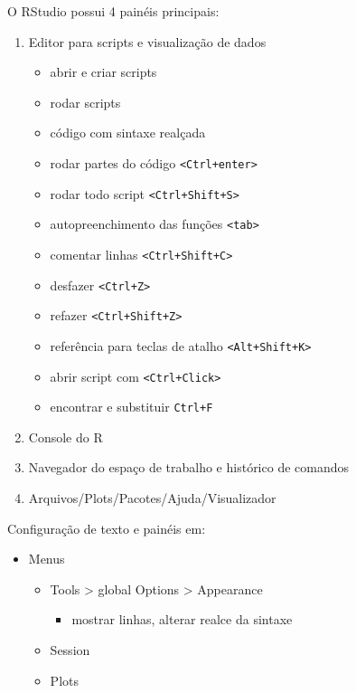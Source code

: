 \documentclass[]{book}
\providecommand{\tightlist}{%
  \setlength{\itemsep}{0pt}\setlength{\parskip}{0pt}}
\begin{document}
O RStudio possui 4 painéis principais:

\begin{enumerate}
\def\labelenumi{\arabic{enumi}.}
\item
  Editor para scripts e visualização de dados

  \begin{itemize}
  \tightlist
  \item
    abrir e criar scripts
  \item
    rodar scripts
  \item
    código com sintaxe realçada
  \item
    rodar partes do código \texttt{\textless{}Ctrl+enter\textgreater{}}
  \item
    rodar todo script \texttt{\textless{}Ctrl+Shift+S\textgreater{}}
  \item
    autopreenchimento das funções \texttt{\textless{}tab\textgreater{}}
  \item
    comentar linhas \texttt{\textless{}Ctrl+Shift+C\textgreater{}}
  \item
    desfazer \texttt{\textless{}Ctrl+Z\textgreater{}}
  \item
    refazer \texttt{\textless{}Ctrl+Shift+Z\textgreater{}}
  \item
    referência para teclas de atalho
    \texttt{\textless{}Alt+Shift+K\textgreater{}}
  \item
    abrir script com \texttt{\textless{}Ctrl+Click\textgreater{}}
  \item
    encontrar e substituir \texttt{Ctrl+F}
  \end{itemize}
\item
  Console do R
\item
  Navegador do espaço de trabalho e histórico de comandos
\item
  Arquivos/Plots/Pacotes/Ajuda/Visualizador
\end{enumerate}

Configuração de texto e painéis em:

\begin{itemize}
\tightlist
\item
  Menus

  \begin{itemize}
  \tightlist
  \item
    Tools \textgreater{} global Options \textgreater{} Appearance

    \begin{itemize}
    \tightlist
    \item
      mostrar linhas, alterar realce da sintaxe
    \end{itemize}
  \item
    Session
  \item
    Plots
  \end{itemize}
\end{itemize}
\end{document}

